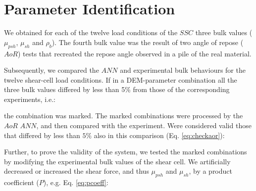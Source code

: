 \lipsum[1]

\section{Parameter Identification}
\label{sec:parameteridentification}

We obtained for each of the twelve load conditions of the $SSC$ three bulk
values ($\mu_{psh}$, $\mu_{sh}$ and $\rho_b$).
The fourth bulk value was the result of two angle of repose ($AoR$) tests that
recreated the repose angle observed in a pile of the
real material. 

Subsequently, we compared the $ANN$ and experimental bulk behaviours for the
twelve shear-cell load conditions.
If in a DEM-parameter combination all the three bulk values differed by less 
than 5\% from those of the corresponding experiments, i.e.:

the combination was marked. The marked combinations were processed by the
$AoR$ $ANN$, and then compared with the experiment.
Were considered valid those that differed by less than $5\%$ also in this
comparison (Eq. \ref{eq:checkaor}):

Further, to prove the validity of the system, we tested the marked combinations
by modifying the experimental bulk values of the shear cell. 
We artificially decreased or increased the shear force, and thus $\mu_{psh}$ and
$\mu_{sh}$, by a product coefficient ($P$), e.g. Eq. \ref{eq:pcoeff}:
